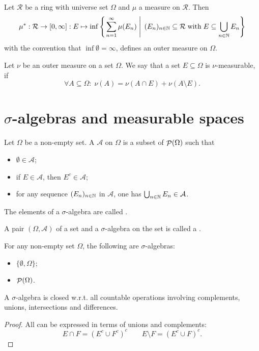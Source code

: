 \begin{proposition}
Let $\mathcal{R}$ be a ring with universe set $\Omega$ and $\mu$ a measure on $\mathcal{R}$. Then
\[ \mu^*: \mathcal{R}\to [0,\infty]: E\mapsto \inf\left\{\left. \sum^\infty_{n=1}\mu(E_n) \;\right|\; (E_n)_{n\in\mathbb{N}}\subseteq \mathcal{R}\;\text{with}\;E\subseteq \bigcup_{n\in\mathbb{N}}E_n \right\} \]
with the convention that $\inf\emptyset = \infty$, defines an outer measure on $\Omega$.
\end{proposition}

\begin{definition}
Let $\nu$ be an outer measure on a set $\Omega$. We say that a set $E\subseteq\Omega$ is $\nu$-measurable, if
\[ \forall A\subseteq \Omega: \; \nu(A) = \nu(A\cap E)+\nu(A\setminus E). \]
\end{definition}

\section{$\sigma$-algebras and measurable spaces}
\begin{definition}
Let $\Omega$ be a non-empty set. A  $\mathcal{A}$ on $\Omega$ is a subset of $\mathop{\mathcal{P}}(\Omega)$ such that
\begin{itemize}
\item $\emptyset \in \mathcal{A}$;
\item if $E\in \mathcal{A}$, then $E^c\in \mathcal{A}$;
\item for any sequence $(E_n)_{n\in\mathbb{N}}$ in $\mathcal{A}$, one has $\bigcup_{n\in\mathbb{N}}E_n \in \mathcal{A}$.
\end{itemize}
The elements of a $\sigma$-algebra are called .

A pair $(\Omega, \mathcal{A})$ of a set and a $\sigma$-algebra on the set is called a .
\end{definition}

\begin{example}
For any non-empty set $\Omega$, the following are $\sigma$-algebras:
\begin{itemize}
\item $\{\emptyset, \Omega\}$;
\item $\mathop{\mathcal{P}}(\Omega)$.
\end{itemize}
\end{example}

\begin{lemma}
A $\sigma$-algebra is closed w.r.t. all countable operations involving complements, unions, intersections and differences.
\end{lemma}
\begin{proof}
All can be expressed in terms of unions and complements:
\[ E\cap F = (E^c\cup F^c)^c\qquad E\setminus F = (E^c\cup F)^c. \]
\end{proof}


